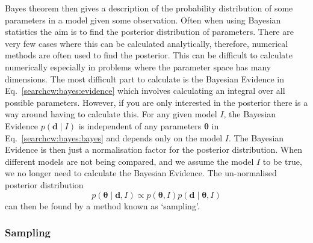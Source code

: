 Bayes theorem then gives a description of the probability distribution of some
parameters in a model given some observation.  Often when using Bayesian
statistics the aim is to find the posterior distribution of parameters.  There are
very few cases where this can be calculated analytically, therefore, numerical
methods are often used to find the posterior.  This
can be difficult to calculate numerically especially in problems where the
parameter space has many dimensions.  The most difficult part to calculate is
the Bayesian Evidence in Eq.~\ref{searchcw:bayes:evidence} which involves calculating an
integral over all possible parameters.  However, if you are only interested in the posterior there is a way around having
to calculate this.  For any given model $I$, the Bayesian Evidence $p({\bm d}\mid I)$ is
independent of any parameters ${\bm \theta}$ in
Eq.~\ref{searchcw:bayes:bayes} and depends only on the model $I$.
The Bayesian Evidence is then just a normalisation factor for the posterior
distribution.  When different models are not being compared, and we assume the
model $I$ to be true, we no longer need to calculate the Bayesian Evidence.  The
un-normalised posterior distribution
%
\begin{equation}
\label{searchcw:bayes:propposterior}
p({\bm \theta} \mid {\bm d}, I) \propto p({\bm \theta}, I)p({\bm d} \mid {\bm \theta}, I)
\end{equation}
can then be found by a method known as `sampling'.


\subsubsection{\label{searchcw:bayes:rejection}Sampling}

